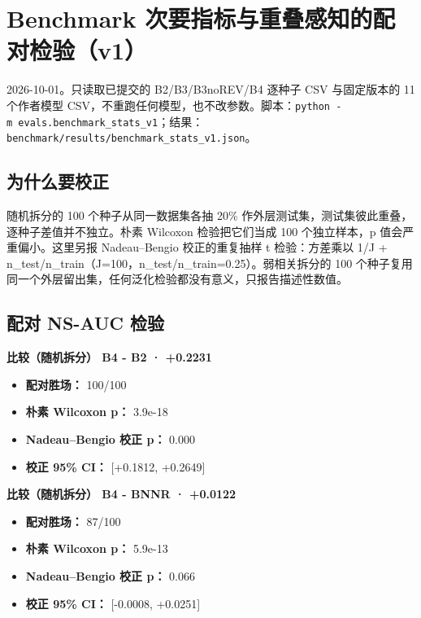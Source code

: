 \documentclass[
  10pt,
]{ctexart}
\author{}
\date{}
\providecommand{\tightlist}{%
  \setlength{\itemsep}{0pt}\setlength{\parskip}{0pt}}
\begin{document}
\section{Benchmark
次要指标与重叠感知的配对检验（v1）}\label{benchmark-ux6b21ux8981ux6307ux6807ux4e0eux91cdux53e0ux611fux77e5ux7684ux914dux5bf9ux68c0ux9a8cv1}

2026-10-01。只读取已提交的 B2/B3/B3noREV/B4 逐种子 CSV 与固定版本的 11
个作者模型
CSV，不重跑任何模型，也不改参数。脚本：\texttt{python\ -m\ evals.\allowbreak{}benchmark\_\allowbreak{}stats\_\allowbreak{}v1}；结果：\texttt{benchmark/\allowbreak{}results/\allowbreak{}benchmark\_\allowbreak{}stats\_\allowbreak{}v1.\allowbreak{}json}。

\subsection{为什么要校正}\label{ux4e3aux4ec0ux4e48ux8981ux6821ux6b63}

随机拆分的 100 个种子从同一数据集各抽 20\%
作外层测试集，测试集彼此重叠，逐种子差值并不独立。朴素 Wilcoxon
检验把它们当成 100 个独立样本，p 值会严重偏小。这里另报 Nadeau--Bengio
校正的重复抽样 t 检验：方差乘以 1/J +
n\_test/n\_train（J=100，n\_test/n\_train=0.25）。弱相关拆分的 100
个种子复用同一个外层留出集，任何泛化检验都没有意义，只报告描述性数值。

\subsection{配对 NS-AUC 检验}\label{ux914dux5bf9-ns-auc-ux68c0ux9a8c}

\textbf{比较（随机拆分） B4 - B2 · +0.2231}

\begin{itemize}
\tightlist
\item
  \textbf{配对胜场：} 100/100
\item
  \textbf{朴素 Wilcoxon p：} 3.9e-18
\item
  \textbf{Nadeau--Bengio 校正 p：} 0.000
\item
  \textbf{校正 95\% CI：} {[}+0.1812, +0.2649{]}
\end{itemize}

\textbf{比较（随机拆分） B4 - BNNR · +0.0122}

\begin{itemize}
\tightlist
\item
  \textbf{配对胜场：} 87/100
\item
  \textbf{朴素 Wilcoxon p：} 5.9e-13
\item
  \textbf{Nadeau--Bengio 校正 p：} 0.066
\item
  \textbf{校正 95\% CI：} {[}-0.0008, +0.0251{]}
\end{itemize}
\end{document}
